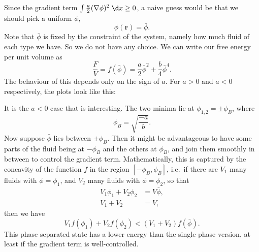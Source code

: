 \documentclass[a4paper]{article}
\begin{document}
Since the gradient term $\int \frac{\kappa}{2} (\nabla \phi)^2\;\d x \geq 0$, a naive guess would be that we should pick a uniform $\phi$,
\[
  \phi(\mathbf{r}) = \bar{\phi}.
\]
Note that $\bar{\phi}$ is fixed by the constraint of the system, namely how much fluid of each type we have. So we do not have any choice. We can write our free energy per unit volume as
\[
  \frac{F}{V} = f(\bar{\phi}) = \frac{a}{2} \bar{\phi}^2 + \frac{b}{4} \bar{\phi}^4.
\]
The behaviour of this depends only on the sign of $a$. For $a > 0$ and $a < 0$ respectively, the plots look like this:
\begin{center}
\end{center}
It is the $a < 0$ case that is interesting. The two minima lie at $\phi_{1, 2} = \pm \phi_B$, where
\[
  \phi_B = \sqrt{\frac{-a}{b}}.
\]
Now suppose $\bar{\phi}$ lies between $\pm \phi_B$. Then it might be advantageous to have some parts of the fluid being at $-\phi_B$ and the others at $\phi_B$, and join them smoothly in between to control the gradient term. Mathematically, this is captured by the concavity of the function $f$ in the region $[-\phi_B, \phi_B]$, i.e.\ if there are $V_1$ many fluids with $\phi = \phi_1$, and $V_2$ many fluids with $\phi = \phi_2$, so that
\begin{align*}
  V_1 \phi_1 + V_2 \phi_2 &= V \bar{\phi},\\
  V_1 + V_2 &= V,
\end{align*}
then we have
\[
  V_1 f(\phi_1) + V_2 f(\phi_2) < (V_1 + V_2) f(\bar{\phi}).
\]
This phase separated state has a lower energy than the single phase version, at least if the gradient term is well-controlled.
\end{document}
